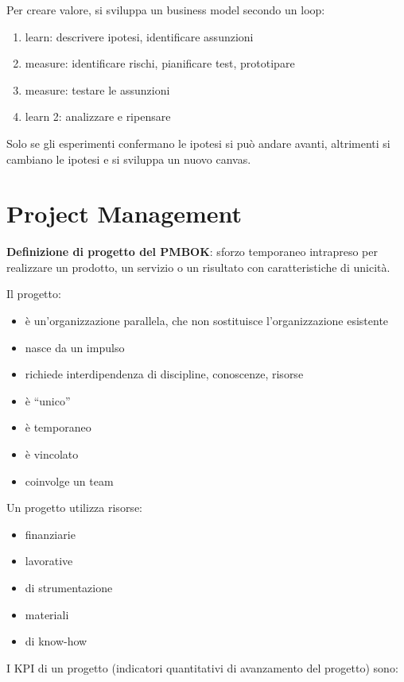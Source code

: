 \documentclass[answers, a4paper, 11pt]{exam}
\begin{document}
Per creare valore, si sviluppa un business model secondo un loop:

\begin{enumerate}
    \item learn: descrivere ipotesi, identificare assunzioni
    \item measure: identificare rischi, pianificare test, prototipare
    \item measure: testare le assunzioni
    \item learn 2: analizzare e ripensare
\end{enumerate}

Solo se gli esperimenti confermano le ipotesi si può andare avanti, altrimenti si cambiano le ipotesi e si sviluppa un nuovo canvas.

\section{Project Management}

\textbf{Definizione di progetto del PMBOK}: sforzo temporaneo intrapreso per realizzare un prodotto, un servizio o un risultato con caratteristiche di unicità.

Il progetto:

\begin{itemize}
    \item è un'organizzazione parallela, che non sostituisce l'organizzazione esistente
    \item nasce da un impulso
    \item richiede interdipendenza di discipline, conoscenze, risorse
    \item è ``unico''
    \item è temporaneo
    \item è vincolato
    \item coinvolge un team
\end{itemize} 

Un progetto utilizza risorse:

\begin{itemize}
    \item finanziarie
    \item lavorative
    \item di strumentazione
    \item materiali
    \item di know-how
\end{itemize}

I KPI di un progetto (indicatori quantitativi di avanzamento del progetto) sono:
\end{document}
